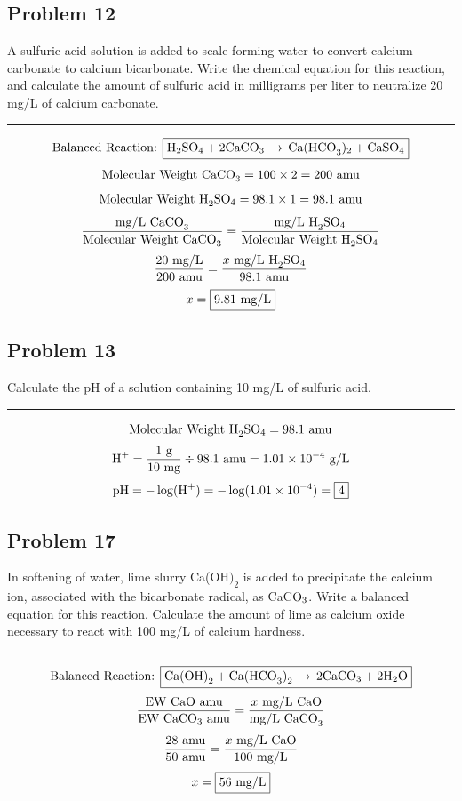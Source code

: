 \subsection*{Problem 12}
A sulfuric acid solution is added to scale-forming water to convert calcium carbonate to calcium bicarbonate. Write the chemical equation for this reaction, and calculate the amount of sulfuric acid in milligrams per liter to neutralize 20 mg/L of calcium carbonate.\\
\rule{5cm}{1pt}
\[\textnormal{Balanced Reaction: }\boxed{\textnormal{H}_2\textnormal{SO}_4+2\textnormal{CaCO}_3\,\rightarrow\,\textnormal{Ca(HCO}_3)_2+\textnormal{CaSO}_4}\]
\[\textnormal{Molecular Weight CaCO}_3=100\times 2=200\textnormal{ amu}\]
\[\textnormal{Molecular Weight H}_2\textnormal{SO}_4=98.1\times 1=98.1\textnormal{ amu}\]
\[\frac{\textnormal{mg/L CaCO}_3}{\textnormal{Molecular Weight CaCO}_3}=\frac{\textnormal{mg/L H}_2\textnormal{SO}_4}{\textnormal{Molecular Weight H}_2\textnormal{SO}_4}\]
\[\frac{20\textnormal{ mg/L}}{\textnormal{200 amu}}=\frac{x \textnormal{ mg/L H}_2\textnormal{SO}_4}{98.1\textnormal{ amu}}\]
\[x=\boxed{9.81\textnormal{ mg/L}}\]
\subsection*{Problem 13}
Calculate the pH of a solution containing 10 mg/L of sulfuric acid.\\
\rule{5cm}{1pt}
\[\textnormal{Molecular Weight H}_2\textnormal{SO}_4=98.1\textnormal{ amu}\]
\[\textnormal{H}^+=\frac{1 \textnormal{ g}}{10 \textnormal{ mg}}\div 98.1\textnormal{ amu}=1.01\times 10^{-4}\textnormal{ g/L}\]
\[\textnormal{pH}=-\log(\textnormal{H}^+)=-\log(1.01\times 10^{-4})=\boxed{4}\]
\subsection*{Problem 17}
In softening of water, lime slurry Ca(OH\()_2\) is added to precipitate the calcium ion, associated with the bicarbonate radical, as CaC\(\textnormal{O}_3\). Write a balanced equation for this reaction. Calculate the amount of lime as calcium oxide necessary to react with 100 mg/L of calcium hardness.\\
\rule{5cm}{1pt}
\[\textnormal{Balanced Reaction: }\boxed{\textnormal{Ca(OH)}_2+\textnormal{Ca(HCO}_3\textnormal{)}_2\,\rightarrow\,2\textnormal{CaCO}_3+2\textnormal{H}_2\textnormal{O}}\]
\[\frac{\textnormal{EW CaO amu}}{\textnormal{EW CaCO}_3\textnormal{ amu}}=\frac{x\textnormal{ mg/L CaO}}{\textnormal{mg/L CaCO}_3}\]
\[\frac{28\textnormal{ amu}}{50\textnormal{ amu}}=\frac{x\textnormal{ mg/L CaO}}{100\textnormal{ mg/L}}\]
\[x=\boxed{56\textnormal{ mg/L}}\]
